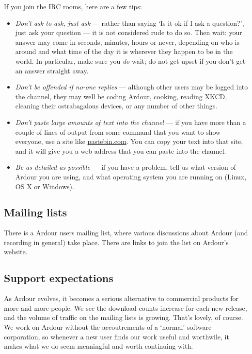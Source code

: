 \documentclass[10pt,a4paper]{book}
\begin{document}
If you join the IRC rooms, here are a few tips:

\begin{itemize}
\item \emph{Don't ask to ask, just ask} --- rather than saying `Is it
  ok if I ask a question?', just ask your question --- it is not
  considered rude to do so.  Then wait: your answer may come in
  seconds, minutes, hours or never, depending on who is around and
  what time of the day it is wherever they happen to be in the world.
  In particular, make sure you \emph{do} wait; do not get upset if you
  don't get an answer straight away.
\item \emph{Don't be offended if no-one replies} --- although other
  users may be logged into the channel, they may well be coding
  Ardour, cooking, reading XKCD, cleaning their ostrabagalous devices,
  or any number of other things.
\item \emph{Don't paste large amounts of text into the channel} --- if
  you have more than a couple of lines of output from some command
  that you want to show everyone, use a site like \url{pastebin.com}.
  You can copy your text into that site, and it will give you a web
  address that you can paste into the channel.
\item \emph{Be as detailed as possible} --- if you have a problem,
  tell us what version of Ardour you are using, and what operating
  system you are running on (Linux, OS X or Windows).
\end{itemize}


\subsection{Mailing lists}

There is a Ardour users mailing list, where various discussions about
Ardour (and recording in general) take place.  There are links to join
the list on Ardour's website.


\subsection{Support expectations}

As Ardour evolves, it becomes a serious alternative to commercial
products for more and more people. We see the download counts increase
for each new release, and the volume of traffic on the mailing lists
is growing. That's lovely, of course. We work on Ardour without the
accoutrements of a `normal' software corporation, so whenever a new
user finds our work useful and worthwile, it makes what we do seem
meaningful and worth continuing with.
\end{document}
